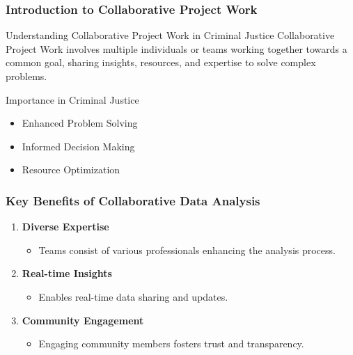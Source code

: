 \documentclass[aspectratio=169]{beamer}
\begin{document}
\frame{\titlepage}

\begin{frame}[fragile]
    \frametitle{Introduction to Collaborative Project Work}
    \begin{block}{Understanding Collaborative Project Work in Criminal Justice}
        Collaborative Project Work involves multiple individuals or teams working together towards a common goal, sharing insights, resources, and expertise to solve complex problems.
    \end{block}
    \begin{block}{Importance in Criminal Justice}
        \begin{itemize}
            \item Enhanced Problem Solving
            \item Informed Decision Making
            \item Resource Optimization
        \end{itemize}
    \end{block}
\end{frame}

\begin{frame}[fragile]
    \frametitle{Key Benefits of Collaborative Data Analysis}
    \begin{enumerate}
        \item \textbf{Diverse Expertise}
            \begin{itemize}
                \item Teams consist of various professionals enhancing the analysis process.
            \end{itemize}
        \item \textbf{Real-time Insights}
            \begin{itemize}
                \item Enables real-time data sharing and updates.
            \end{itemize}
        \item \textbf{Community Engagement}
            \begin{itemize}
                \item Engaging community members fosters trust and transparency.
            \end{itemize}
    \end{enumerate}
\end{frame}
\end{document}
